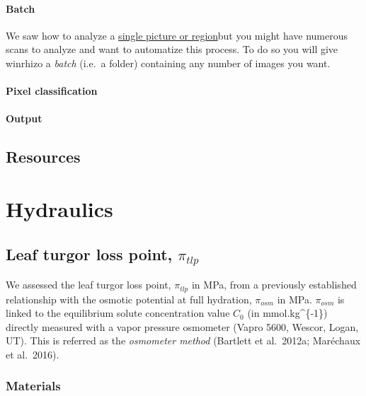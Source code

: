 \documentclass[
  12pt,
  american,
  a4paper,
  extrafontsizes,onecolumn,openright
  ]{memoir}
\begin{document}
\hypertarget{batch}{%
\subsubsection{Batch}\label{batch}}

We saw how to analyze a \protect\hyperlink{first-analysis}{single picture or region}but you might have numerous scans to analyze and want to automatize this process. To do so you will give winrhizo a \emph{batch} (i.e.~a folder) containing any number of images you want.

\hypertarget{pixel-classification}{%
\subsubsection{Pixel classification}\label{pixel-classification}}

\hypertarget{output}{%
\subsubsection{Output}\label{output}}

\hypertarget{resources}{%
\section{Resources}\label{resources}}

\hypertarget{hydraulics}{%
\chapter{Hydraulics}\label{hydraulics}}

\hypertarget{leaf-turgor-loss-point-pi_tlp}{%
\section{\texorpdfstring{Leaf turgor loss point, \(\pi_{tlp}\)}{Leaf turgor loss point, \textbackslash pi\_\{tlp\}}}\label{leaf-turgor-loss-point-pi_tlp}}

We assessed the leaf turgor loss point, \(\pi_{tlp}\) in MPa, from a previously established relationship with the osmotic potential at full hydration, \(\pi_{osm}\) in MPa. \(\pi_{osm}\) is linked to the equilibrium solute concentration value \(C_0\) (in mmol.kg\^{}\{-1\}) directly measured with a vapor pressure osmometer (Vapro 5600, Wescor, Logan, UT). This is referred as the \emph{osmometer method} (Bartlett et al.~2012a; Maréchaux et al.~2016).

\hypertarget{materials}{%
\subsection{Materials}\label{materials}}
\end{document}
